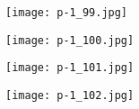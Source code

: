 \clearpage


\begin{figure}
    \begin{center}
        \texttt{[image: p-1\_99.jpg]}
        \caption{}
    \end{center}
\end{figure}

\clearpage


\begin{figure}
    \begin{center}
        \texttt{[image: p-1\_100.jpg]}
        \caption{}
    \end{center}
\end{figure}

\clearpage


\begin{figure}
    \begin{center}
        \texttt{[image: p-1\_101.jpg]}
        \caption{}
    \end{center}
\end{figure}

\clearpage


\begin{figure}
    \begin{center}
        \texttt{[image: p-1\_102.jpg]}
        \caption{}
    \end{center}
\end{figure}

\clearpage

